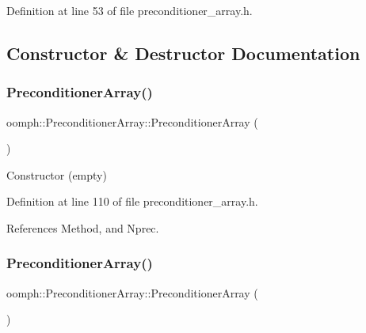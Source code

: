 Definition at line 53 of file preconditioner\+\_\+array.\+h.



\subsection{Constructor \& Destructor Documentation}
\mbox{\label{classoomph_1_1PreconditionerArray_af982432ce1975ed8ba55948fdccb38ba}} 
\subsubsection{\texorpdfstring{Preconditioner\+Array()}{PreconditionerArray()}\hspace{0.1cm}{\footnotesize\ttfamily [1/2]}}
{\footnotesize\ttfamily oomph\+::\+Preconditioner\+Array\+::\+Preconditioner\+Array (\begin{DoxyParamCaption}{ }\end{DoxyParamCaption})\hspace{0.3cm}{\ttfamily [inline]}}



Constructor (empty) 



Definition at line 110 of file preconditioner\+\_\+array.\+h.



References Method, and Nprec.

\mbox{\label{classoomph_1_1PreconditionerArray_a39b7ea03b0a0bdee36546f759f1632b9}} 
\subsubsection{\texorpdfstring{Preconditioner\+Array()}{PreconditionerArray()}\hspace{0.1cm}{\footnotesize\ttfamily [2/2]}}
{\footnotesize\ttfamily oomph\+::\+Preconditioner\+Array\+::\+Preconditioner\+Array (\begin{DoxyParamCaption}\item[{const \hyperlink{classoomph_1_1PreconditionerArray}{Preconditioner\+Array} \&}]{ }\end{DoxyParamCaption})\hspace{0.3cm}{\ttfamily [inline]}}



